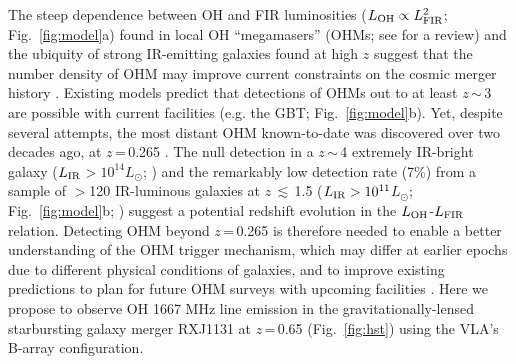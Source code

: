 \documentclass[letterpaper,11pt]{article}
\newcommand{\Lsun}{\mbox{$L_{\odot}$}\xspace}
\newcommand{\LIR}{\mbox{$L_{\rm IR}$}\xspace}
\newcommand{\LFIR}{\mbox{$L_{\rm FIR}$}\xspace}
\newcommand{\LOH}{$L_{\rm OH}$\xspace}
\newcommand{\Fig}[1]{Fig.~\ref{fig:#1}}
\newcommand{\eq}{\,=\,}
\newcommand{\ssim}{\,$\sim$\,}
\begin{document}
\noindent The steep dependence between OH and FIR luminosities ($L_{\rm OH}\propto L_{\rm FIR}^2$; \Fig{model}a)
found in local OH ``megamasers'' (OHMs;  see \citealt[]{Lo05a} for a review) and
the ubiquity of strong IR-emitting galaxies found at high $z$ suggest that
the number density of OHM may improve current constraints on
the cosmic merger history \citep[hereafter DG02]{Darling02b_LF}. %
Existing models predict that detections of
OHMs out to at least $z$\ssim3 are possible with current facilities (e.g. the GBT; \Fig{model}b).
Yet, despite several attempts,
the most distant OHM known-to-date was discovered over two decades ago, at $z$\eq0.265 \citep{Baan92a}.
The null detection in a $z$\ssim4 extremely IR-bright galaxy (\LIR$>10^{14}$\Lsun; \citealt{Ivison06a}) and
the remarkably low detection rate (7\%) from a sample of $>$120 IR-luminous galaxies
at $z$\,$\lesssim$\,1.5 ($L_{\rm IR}>10^{11}$\Lsun; \Fig{model}b; \citealt{Willett12a})
suggest a potential redshift evolution in the \LOH-\LFIR relation.
Detecting OHM beyond $z$\eq0.265 is therefore needed to enable a better understanding of the
OHM trigger mechanism, which may differ at earlier epochs due to different physical conditions of galaxies,
and to improve existing predictions to plan for future OHM surveys with upcoming facilities
\citep[e.g., FAST, APERTIF/WSRT, ASKAP;][]{Zhang14b}.
Here we propose to observe OH 1667 MHz line emission in the
gravitationally-lensed starbursting galaxy merger
RXJ1131 at $z$\eq0.65 (\Fig{hst}) using the VLA's B-array configuration.
\end{document}
